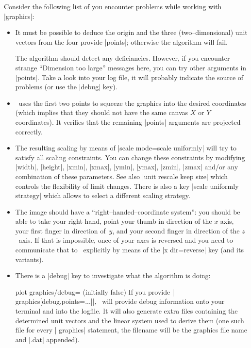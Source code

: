 {{\noindent
Consider the following list of you encounter problems while working with  |graphics|:
\begin{itemize}
	\item It must be possible to deduce the origin and the three (two--dimensional) unit vectors from the four provide |points|; otherwise the algorithm will fail. 
	
	The algorithm should detect any deficiancies. However, if you encounter strange ``Dimension too large'' messages here, you can try other arguments in |points|. Take a look into your log file, it will probably indicate the source of problems (or use the |debug| key).

	\item \PGFPlots\ uses the first two points to squeeze the graphics into the desired coordinates (which implies that they should not have the same canvas $X$ or $Y$ coordinates). It verifies that the remaining |points| arguments are projected correctly.
	\item The resulting scaling by means of |scale mode=scale uniformly| will try to satisfy all scaling constraints. You can change these constraints by modifying |width|, |height|, |xmin|, |xmax|, |ymin|, |ymax|, |zmin|, |zmax| and/or any combination of these parameters. See also |unit rescale keep size| which controls the flexibility of limit changes. There is also a key |scale uniformly strategy| which allows to select a different scaling strategy.
	 
	\item The image should have a ``right--handed--coordinate system'': you should be able to take your right hand, point your thumb in direction of the $x$ axis, your first finger in direction of~$y$, and your second finger in direction of the $z$~axis. If that is impossible, once of your axes is reversed and you need to communicate that to \PGFPlots\ explicitly by means of the |x dir=reverse| key (and its variants).

	\item There is a |debug| key to investigate what the algorithm is doing:
\begin{pgfplotskey}{plot graphics/debug= (initially false)}
	If you provide | graphics[debug,points={...}]|, \PGFPlots\ will provide debug information onto your terminal and into the logfile. It will also generate extra files containing the determined unit vectors and the linear system used to derive them (one such file for every | graphics| statement, the filename will be the graphics file name and |.dat| appended).


\end{pgfplotskey}
\end{itemize}}}
